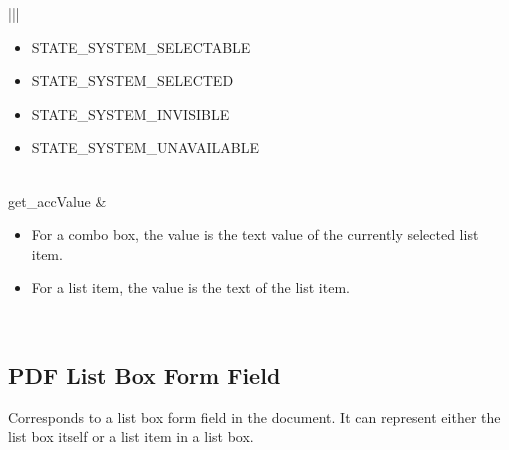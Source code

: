 \documentclass[letterpaper,12pt,english,openany,oneside]{sphinxmanual}
\begin{document}
\begin{savenotes}
\begin{tabular}[t]{|*{2}{|}}
\begin{itemize}
\begin{description}
\begin{itemize}
\item {} 
STATE\_SYSTEM\_SELECTABLE

\item {} 
STATE\_SYSTEM\_SELECTED

\item {} 
STATE\_SYSTEM\_INVISIBLE

\item {} 
STATE\_SYSTEM\_UNAVAILABLE

\end{itemize}

\end{description}

\end{itemize}
\\
\hline
get\_accValue
&\begin{itemize}
\item {} 
For a combo box, the value is the text value of the currently selected list item.

\item {} 
For a list item, the value is the text of the list item.

\end{itemize}
\\
\hline
\end{tabular}
\par
\sphinxattableend\end{savenotes}




\subsection{PDF List Box Form Field}
\label{\detokenize{MSAA_PDF:pdf-list-box-form-field}}
Corresponds to a list box form field in the document. It can represent either the list box itself or a list item in a list box.
\end{document}
